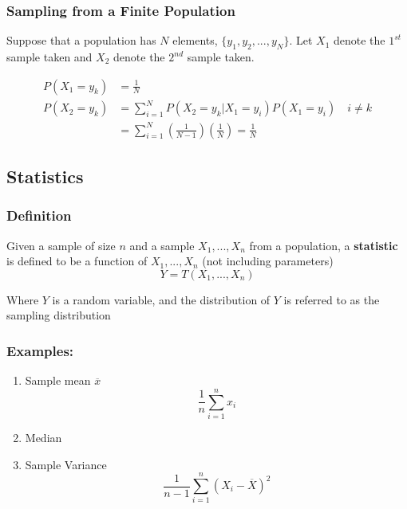 \documentclass{article}
\begin{document}
\subsubsection{Sampling from a Finite Population}

Suppose that a population has $N$ elements, $\{y_1, y_2,...,y_N\}$. Let $X_1$ denote the $1^{st}$ sample taken and $X_2$ denote the $2^{nd}$ sample taken.

\begin{equation*}
    \begin{split}
        P(X_1 = y_k) &= \frac{1}{N}\\
        P(X_2 = y_k) &= \sum_{i=1}^N P(X_2 = y_k | X_1 = y_i) P(X_1 = y_i) \quad i \neq k\\
            &= \sum_{i=1}^N \left(\frac{1}{N-1}\right) \left(\frac{1}{N} \right) = \frac{1}{N}
    \end{split}
\end{equation*}

\subsection{Statistics}

\subsubsection*{Definition}

Given a sample of size $n$ and a sample $X_1,...,X_n$ from a population, a \textbf{statistic} is defined to be a function of $X_1,...,X_n$ (not including parameters)
\begin{equation*}
    Y = T(X_1,...,X_n)
\end{equation*}

Where $Y$ is a random variable, and the distribution of $Y$ is referred to as the sampling distribution

\subsubsection*{Examples:}
\begin{enumerate}
    \item Sample mean $\overline{x}$
    \begin{equation*}
       \frac{1}{n} \sum_{i=1}^n x_i
    \end{equation*}

    \item Median

    \item Sample Variance
    \begin{equation*}
        \frac{1}{n-1} \sum_{i=1}^n (X_i - \overline{X})^2
    \end{equation*}
\end{enumerate}
\end{document}
